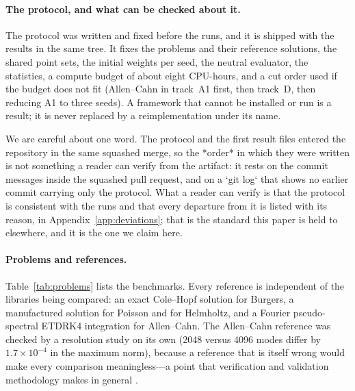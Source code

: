 \documentclass[11pt]{article}
\begin{document}
\paragraph{The protocol, and what can be checked about it.} The protocol was written and fixed
before the runs, and it is shipped with the results in the same tree. It fixes the problems and their
reference solutions, the shared point sets, the initial weights per seed, the neutral evaluator, the
statistics, a compute budget of about eight CPU-hours, and a cut order used if the budget does not fit
(Allen--Cahn in track~A1 first, then track~D, then reducing A1 to three seeds). A framework that
cannot be installed or run is a result; it is never replaced by a reimplementation under its name.

We are careful about one word. The protocol and the first result files entered the repository in the
same squashed merge, so the *order* in which they were written is not something a reader can verify
from the artifact: it rests on the commit messages inside the squashed pull request, and on a
`git log` that shows no earlier commit carrying only the protocol. What a reader can verify is that
the protocol is consistent with the runs and that every departure from it is listed with its reason,
in Appendix~\ref{app:deviations}; that is the standard this paper is held to elsewhere, and it is the
one we claim here.

\paragraph{Problems and references.} Table~\ref{tab:problems} lists the benchmarks. Every reference
is independent of the libraries being compared: an exact Cole--Hopf solution for Burgers, a
manufactured solution for Poisson and for Helmholtz, and a Fourier pseudo-spectral ETDRK4
integration \citep{kassam2005fourth} for Allen--Cahn. The Allen--Cahn reference was checked by a
resolution study on its own (2048 versus 4096 modes differ by $1.7\times10^{-4}$ in the maximum
norm), because a reference that is itself wrong would make every comparison meaningless---a point
that verification and validation methodology makes in general \citep{oberkampf2010vv}.
\end{document}
